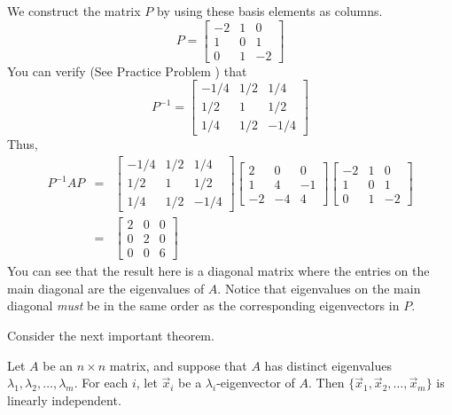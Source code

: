 \documentclass{ximera}
\begin{document}
\begin{example}
\begin{explanation}
We construct the matrix $P$ by using these basis elements as columns.
\begin{equation*}
P=\begin{bmatrix}
-2 & 1 & 0 \\
1 & 0 & 1 \\
0 & 1 & -2
\end{bmatrix}
\end{equation*}
You can verify (See Practice Problem ) that
\begin{equation*}
P^{-1}=\begin{bmatrix}
-1/4 & 1/2 & 1/4 \\
1/2 & 1 & 1/2 \\
1/4 & 1/2 & -1/4
\end{bmatrix}
\end{equation*}
Thus,
\begin{eqnarray*}
P^{-1}AP &=&\begin{bmatrix}
-1/4 & 1/2 & 1/4 \\
1/2 & 1 & 1/2 \\
1/4 & 1/2 & -1/4
\end{bmatrix} \begin{bmatrix}
2 & 0 & 0 \\
1 & 4 & -1 \\
-2 & -4 & 4
\end{bmatrix} \begin{bmatrix}
-2 & 1 & 0 \\
1 & 0 & 1 \\
0 & 1 & -2
\end{bmatrix} \\
&=&\begin{bmatrix}
2 & 0 & 0 \\
0 & 2 & 0 \\
0 & 0 & 6
\end{bmatrix}
\end{eqnarray*}
You can see that the result here is a diagonal matrix where the entries on the main diagonal are the eigenvalues of $A$. Notice that eigenvalues on the main diagonal {\it must} be in the same order as the corresponding eigenvectors in $P$.
\end{explanation}
\end{example}
Consider the next important theorem.

\begin{theorem}\label{th:linindepeigenvectors}
Let $A$ be an $n\times n$ matrix, and suppose that $A$
has distinct eigenvalues $\lambda_1, \lambda_2, \ldots, \lambda_m$.
For each $i$, let $\vec{x}_i$ be a $\lambda_i$-eigenvector of $A$.
Then $\{ \vec{x}_1, \vec{x}_2, \ldots, \vec{x}_m\}$ is
linearly independent.
\end{theorem}
\end{document}
